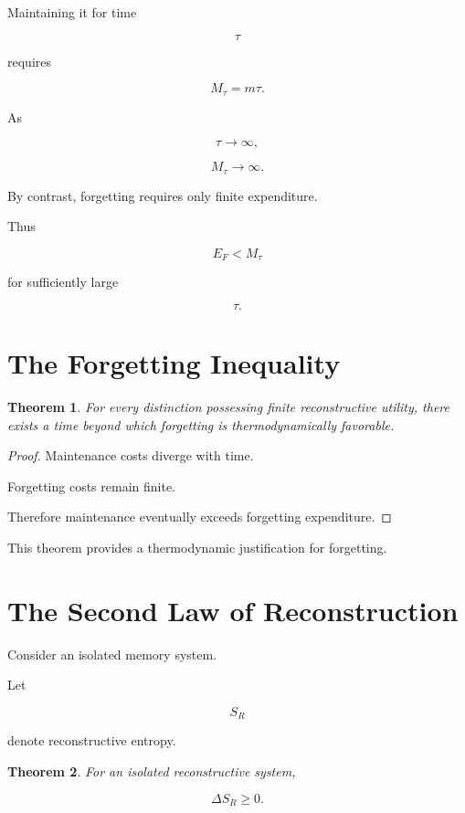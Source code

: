 \documentclass[12pt,oneside]{book}
\theoremstyle{plain} \newtheorem{theorem}{Theorem}[chapter] \newtheorem{lemma}[theorem]{Lemma} \newtheorem{proposition}[theorem]{Proposition} \newtheorem{corollary}[theorem]{Corollary}
\theoremstyle{definition} \newtheorem{definition}[theorem]{Definition} \newtheorem{axiom}[theorem]{Axiom} \newtheorem{construction}[theorem]{Construction}
\theoremstyle{remark} \newtheorem{remark}[theorem]{Remark} \newtheorem{example}[theorem]{Example}
\begin{document}
Maintaining it for time

\[
\tau
\]

requires

\[
M_\tau
=
m\tau.
\]

As

\[
\tau
\rightarrow
\infty,
\]

\[
M_\tau
\rightarrow
\infty.
\]

By contrast, forgetting requires only finite expenditure.

Thus

\[
E_F
<
M_\tau
\]

for sufficiently large

\[
\tau.
\]

\section{The Forgetting Inequality}

\begin{theorem}

For every distinction possessing finite reconstructive utility, there exists a time beyond which forgetting is thermodynamically favorable.

\end{theorem}

\begin{proof}

Maintenance costs diverge with time.

Forgetting costs remain finite.

Therefore maintenance eventually exceeds forgetting expenditure.

\end{proof}

This theorem provides a thermodynamic justification for forgetting.

\section{The Second Law of Reconstruction}

Consider an isolated memory system.

Let

\[
S_R
\]

denote reconstructive entropy.

\begin{theorem}

For an isolated reconstructive system,

\[
\Delta S_R
\ge
0.
\]

\end{theorem}
\end{document}
